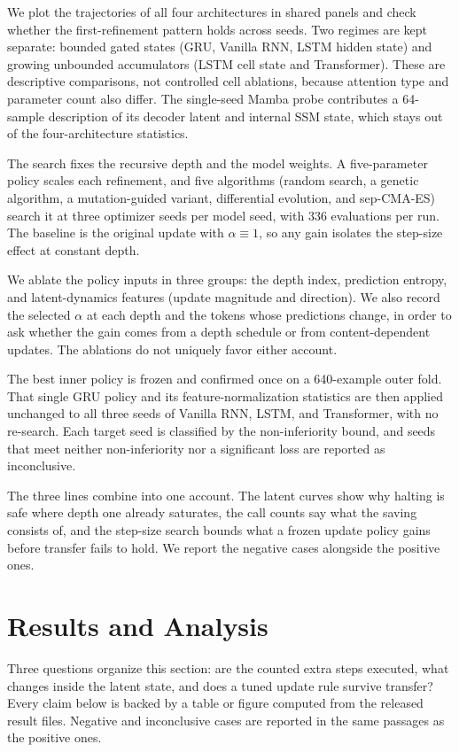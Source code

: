 \documentclass[11pt]{article}
\begin{document}
We plot the trajectories of all four architectures in shared panels and check whether the first-refinement pattern holds across seeds. Two regimes are kept separate: bounded gated states (GRU, Vanilla RNN, LSTM hidden state) and growing unbounded accumulators (LSTM cell state and Transformer). These are descriptive comparisons, not controlled cell ablations, because attention type and parameter count also differ. The single-seed Mamba probe contributes a 64-sample description of its decoder latent and internal SSM state, which stays out of the four-architecture statistics.

The search fixes the recursive depth and the model weights. A five-parameter policy scales each refinement, and five algorithms (random search, a genetic algorithm, a mutation-guided variant, differential evolution, and sep-CMA-ES) search it at three optimizer seeds per model seed, with 336 evaluations per run. The baseline is the original update with $\alpha\equiv1$, so any gain isolates the step-size effect at constant depth.

We ablate the policy inputs in three groups: the depth index, prediction entropy, and latent-dynamics features (update magnitude and direction). We also record the selected $\alpha$ at each depth and the tokens whose predictions change, in order to ask whether the gain comes from a depth schedule or from content-dependent updates. The ablations do not uniquely favor either account.

The best inner policy is frozen and confirmed once on a 640-example outer fold. That single GRU policy and its feature-normalization statistics are then applied unchanged to all three seeds of Vanilla RNN, LSTM, and Transformer, with no re-search. Each target seed is classified by the non-inferiority bound, and seeds that meet neither non-inferiority nor a significant loss are reported as inconclusive.

The three lines combine into one account. The latent curves show why halting is safe where depth one already saturates, the call counts say what the saving consists of, and the step-size search bounds what a frozen update policy gains before transfer fails to hold. We report the negative cases alongside the positive ones.


\section{Results and Analysis}
\label{sec:results}

Three questions organize this section: are the counted extra steps executed, what changes inside the latent state, and does a tuned update rule survive transfer? Every claim below is backed by a table or figure computed from the released result files. Negative and inconclusive cases are reported in the same passages as the positive ones.
\end{document}
